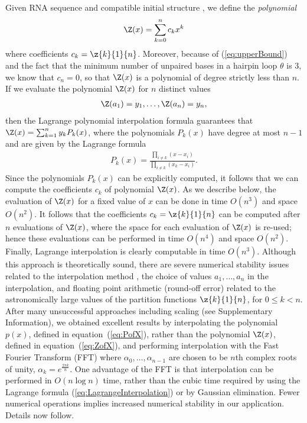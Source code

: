 Given RNA sequence \seq and compatible initial structure \strSt,
we define the {\em polynomial}
\begin{eqnarray}
\label{eq:polynomialYann}
\Z(x) = \sum_{k=0}^n c_k x^k
\end{eqnarray}
where coefficients $c_k=\z{k}{1}{n}$. Moreover, because of
(\ref{eq:upperBound}) and the fact that the minimum number of
unpaired bases in a hairpin loop $\theta$ is $3$, we know that $c_n=0$,
so that $\Z(x)$ is a polynomial of degree strictly less than $n$.
If we evaluate the polynomial $\Z(x)$ for $n$ distinct values
\begin{eqnarray}
\label{eq:ZofX}
\Z(a_1) = y_1,\ldots, \Z(a_{n}) = y_{n},
\end{eqnarray}
then the Lagrange polynomial interpolation formula guarantees that
$\Z(x) = \sum_{k=1}^n y_k P_k(x)$, where the polynomials $P_k(x)$ have degree
at most $n-1$ and are given by the Lagrange formula
\begin{eqnarray}
\label{eq:LagrangeInterpolation}
P_k(x) = \frac{\prod_{i\ne k} (x-x_i)}{\prod_{i \ne k} (x_k-x_i)}.
\end{eqnarray}
Since the polynomials $P_k(x)$ can be explicitly computed, it follows that
we can compute the coefficients $c_k$ of polynomial $\Z(x)$. As we describe
below, the evaluation of $\Z(x)$ for a fixed value of $x$ can be done in
time $O(n^3)$ and space $O(n^2)$.  It follows that the coefficients
$c_k=\z{k}{1}{n}$ can be computed after
$n$ evaluations of $\Z(x)$, where the space for each evaluation of $\Z(x)$
is re-used; hence these evaluations can be performed in time $O(n^4)$ and space
$O(n^2)$. Finally,
Lagrange interpolation is clearly computable in time $O(n^3)$.
Although this approach is theoretically sound, there are severe
numerical stability issues related to the interpolation method
\cite{HighamBarycentricInterpolation},
the choice of values $a_1,\ldots,a_{n}$ in the interpolation,
and floating point arithmetic (round-off error) related to the
astronomically large values of the partition functions
$\z{k}{1}{n}$, for $0 \leq k < n$. After many unsuccessful
approaches including scaling (see Supplementary Information),
we obtained excellent results by
interpolating the polynomial $p(x)$, defined in equation~(\ref{eq:PofX}),
rather than the polynomial $\Z(x)$, defined in equation~(\ref{eq:ZofX}),
and performing interpolation with the Fast Fourier Transform (FFT) \cite{cormen}
where $\alpha_0,\ldots,\alpha_{n-1}$ are
chosen to be $n$th complex roots of unity,
$\alpha_k = e^{\frac{2 \pi k}{n}}$.
One
advantage of the FFT is that interpolation can be performed in $O(n \log n)$
time, rather than the cubic time required by using the Lagrange formula
(\ref{eq:LagrangeInterpolation}) or by Gaussian elimination. Fewer
numerical operations implies increased numerical stability in our application.
Details now follow.

